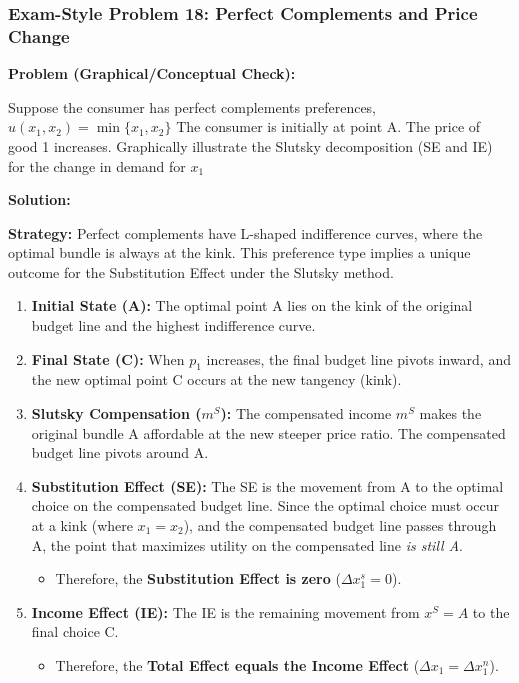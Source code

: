 \documentclass{article}
\begin{document}
\subsubsection*{Exam-Style Problem 18: Perfect Complements and Price Change}

\textbf{Problem (Graphical/Conceptual Check):}

Suppose the consumer has perfect complements preferences, $u(x_1, x_2) = \min\{x_1, x_2\}$ The consumer is initially at point A. The price of good 1 increases. Graphically illustrate the Slutsky decomposition (SE and IE) for the change in demand for $x_1$

\vspace{1em}
\textbf{Solution:}

\vspace{1em}
\textbf{Strategy:} Perfect complements have L-shaped indifference curves, where the optimal bundle is always at the kink. This preference type implies a unique outcome for the Substitution Effect under the Slutsky method.

\begin{enumerate}
    \item \textbf{Initial State (A):} The optimal point A lies on the kink of the original budget line and the highest indifference curve.
    \item \textbf{Final State (C):} When $p_1$ increases, the final budget line pivots inward, and the new optimal point C occurs at the new tangency (kink).
    \item \textbf{Slutsky Compensation ($m^S$):} The compensated income $m^S$ makes the original bundle A affordable at the new steeper price ratio. The compensated budget line pivots around A.
    \item \textbf{Substitution Effect (SE):} The SE is the movement from A to the optimal choice on the compensated budget line. Since the optimal choice must occur at a kink (where $x_1=x_2$), and the compensated budget line passes through A, the point that maximizes utility on the compensated line \textit{is still A}.
    \begin{itemize}
        \item Therefore, the \textbf{Substitution Effect is zero} ($\Delta x_1^s = 0$).
    \end{itemize}
    \item \textbf{Income Effect (IE):} The IE is the remaining movement from $x^S=A$ to the final choice C.
    \begin{itemize}
        \item Therefore, the \textbf{Total Effect equals the Income Effect} ($\Delta x_1 = \Delta x_1^n$).
    \end{itemize}
\end{enumerate}
\end{document}
